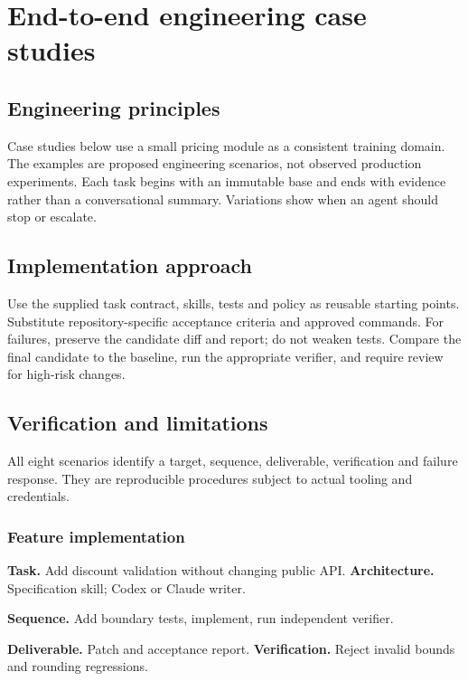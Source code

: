 \chapter{End-to-end engineering case studies}

\section{Engineering principles}

Case studies below use a small pricing module as a consistent training domain. The examples are proposed engineering scenarios, not observed production experiments. Each task begins with an immutable base and ends with evidence rather than a conversational summary. Variations show when an agent should stop or escalate.

\section{Implementation approach}

Use the supplied task contract, skills, tests and policy as reusable starting points. Substitute repository-specific acceptance criteria and approved commands. For failures, preserve the candidate diff and report; do not weaken tests. Compare the final candidate to the baseline, run the appropriate verifier, and require review for high-risk changes.

\section{Verification and limitations}

All eight scenarios identify a target, sequence, deliverable, verification and failure response. They are reproducible procedures subject to actual tooling and credentials.

\subsection{Feature implementation}

\textbf{Task.} Add discount validation without changing public API. \textbf{Architecture.} Specification skill; Codex or Claude writer.

\textbf{Sequence.} Add boundary tests, implement, run independent verifier.

\textbf{Deliverable.} Patch and acceptance report. \textbf{Verification.} Reject invalid bounds and rounding regressions.

